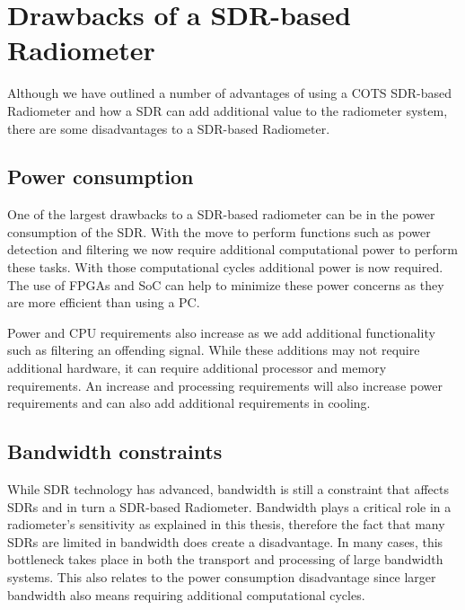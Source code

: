 \section{Drawbacks of a SDR-based Radiometer}
Although we have outlined a number of advantages of using a COTS SDR-based Radiometer and how a SDR can add additional value to the radiometer system, there are some disadvantages to a SDR-based Radiometer.

\subsection{Power consumption}
One of the largest drawbacks to a SDR-based radiometer can be in the power consumption of the SDR.  With the move to perform functions such as power detection and filtering we now require additional computational power to perform these tasks.  With those computational cycles additional power is now required.  The use of FPGAs and SoC can help to minimize these power concerns as they are more efficient than using a PC.  

Power and CPU requirements also increase as we add additional functionality such as filtering an offending signal.  While these additions may not require additional hardware, it can require additional processor and memory requirements.  An increase and processing requirements will also increase power requirements and can also add additional requirements in cooling.

\subsection{Bandwidth constraints}
While SDR technology has advanced, bandwidth is still a constraint that affects SDRs and in turn a SDR-based Radiometer.  Bandwidth plays a critical role in a radiometer's sensitivity as explained in this thesis, therefore the fact that many SDRs are limited in bandwidth does create a disadvantage.  In many cases, this bottleneck takes place in both the transport and processing of large bandwidth systems.  This also relates to the power consumption disadvantage since larger bandwidth also means requiring additional computational cycles.



